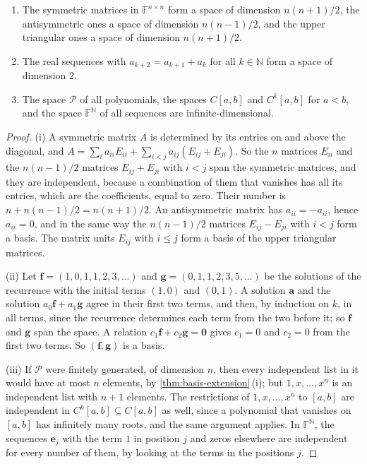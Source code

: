 \begin{proposition}
\label{prop:dimension-examples}
\leavevmode
\begin{enumerate}
\item The symmetric matrices in $\mathbb F^{n\times n}$ form a space of dimension $n(n+1)/2$, the antisymmetric ones a space of dimension $n(n-1)/2$, and the upper triangular ones a space of dimension $n(n+1)/2$.
\item The real sequences with $a_{k+2}=a_{k+1}+a_k$ for all $k\in\mathbb N$ form a space of dimension $2$.
\item The space $\mathcal P$ of all polynomials, the spaces $C[a,b]$ and $C^k[a,b]$ for $a<b$, and the space $\mathbb F^{\mathbb N}$ of all sequences are infinite-dimensional.
\end{enumerate}
\end{proposition}

\begin{proof}
(i) A symmetric matrix $A$ is determined by its entries on and above the diagonal, and $A=\sum_ia_{ii}E_{ii}+\sum_{i<j}a_{ij}(E_{ij}+E_{ji})$. So the $n$ matrices $E_{ii}$ and the $n(n-1)/2$ matrices $E_{ij}+E_{ji}$ with $i<j$ span the symmetric matrices, and they are independent, because a combination of them that vanishes has all its entries, which are the coefficients, equal to zero. Their number is $n+n(n-1)/2=n(n+1)/2$. An antisymmetric matrix has $a_{ii}=-a_{ii}$, hence $a_{ii}=0$, and in the same way the $n(n-1)/2$ matrices $E_{ij}-E_{ji}$ with $i<j$ form a basis. The matrix units $E_{ij}$ with $i\le j$ form a basis of the upper triangular matrices.

(ii) Let $\mathbf f=(1,0,1,1,2,3,\ldots)$ and $\mathbf g=(0,1,1,2,3,5,\ldots)$ be the solutions of the recurrence with the initial terms $(1,0)$ and $(0,1)$. A solution $\mathbf a$ and the solution $a_0\mathbf f+a_1\mathbf g$ agree in their first two terms, and then, by induction on $k$, in all terms, since the recurrence determines each term from the two before it; so $\mathbf f$ and $\mathbf g$ span the space. A relation $c_1\mathbf f+c_2\mathbf g=\mathbf 0$ gives $c_1=0$ and $c_2=0$ from the first two terms. So $(\mathbf f,\mathbf g)$ is a basis.

(iii) If $\mathcal P$ were finitely generated, of dimension $n$, then every independent list in it would have at most $n$ elements, by \cref{thm:basis-extension}\,(i); but $1,x,\ldots,x^n$ is an independent list with $n+1$ elements. The restrictions of $1,x,\ldots,x^n$ to $[a,b]$ are independent in $C^k[a,b]\subseteq C[a,b]$ as well, since a polynomial that vanishes on $[a,b]$ has infinitely many roots, and the same argument applies. In $\mathbb F^{\mathbb N}$, the sequences $\mathbf e_j$ with the term $1$ in position $j$ and zeros elsewhere are independent for every number of them, by looking at the terms in the positions $j$.
\end{proof}

